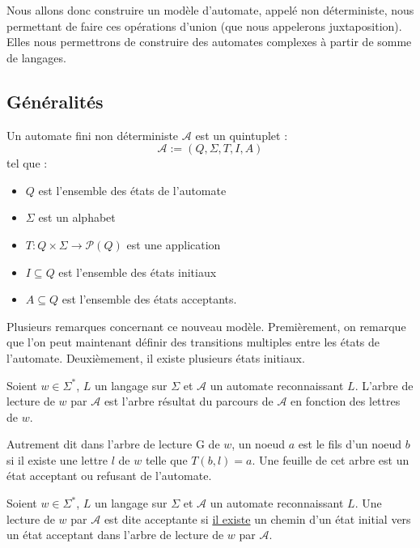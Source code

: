 Nous allons donc construire un modèle d'automate, appelé non déterministe, nous permettant de faire ces opérations 
d'union (que nous appelerons juxtaposition). Elles nous permettrons de construire des automates complexes à partir de 
somme de langages. 


\subsection{Généralités}

\begin{definition}[AFN]
    Un automate fini non déterministe $ \mathcal{A}$ est un quintuplet : 
        \[ \mathcal{A} := (Q,\Sigma, T,I,A) \] 
    tel que :
    \begin{itemize}
        \item $Q$ est l'ensemble des états de l'automate 
        \item $\Sigma$ est un alphabet 
        \item $T : Q \times \Sigma \longrightarrow \mathcal{P}(Q)$ est une application 
        \item $I \subseteq Q$ est l'ensemble des états initiaux 
        \item $A \subseteq Q$ est l'ensemble des états acceptants. 
    \end{itemize}
\end{definition}

\begin{remark}
    Plusieurs remarques concernant ce nouveau modèle. Premièrement, on remarque que l'on peut maintenant définir 
    des transitions multiples entre les états de l'automate. Deuxièmement, il existe plusieurs états initiaux. 
\end{remark}

\begin{definition}
    Soient $w \in \Sigma^*$, $L$ un langage sur $\Sigma$ et $ \mathcal{A}$ un automate reconnaissant $L$.
    L'arbre de lecture de $w$ par $ \mathcal{A}$ est l'arbre résultat du parcours de $ \mathcal{A}$ en fonction 
    des lettres de $w$. 
    
    Autrement dit dans l'arbre de lecture G de $w$, un noeud $a$ est le fils d'un 
    noeud $b$ si il existe une lettre $l$ de $w$ telle que $T(b,l) = a$. Une feuille de cet arbre est un état acceptant 
    ou refusant de l'automate. 
\end{definition}

\begin{definition}
    Soient $w \in \Sigma^*$, $L$ un langage sur $\Sigma$ et $ \mathcal{A}$ un automate reconnaissant $L$. 
    Une lecture de $w$ par $ \mathcal{A}$ est dite acceptante si \underline{il existe} un chemin 
    d'un état initial vers un état acceptant dans l'arbre de lecture de $w$ par $ \mathcal{A}$. 
\end{definition}

